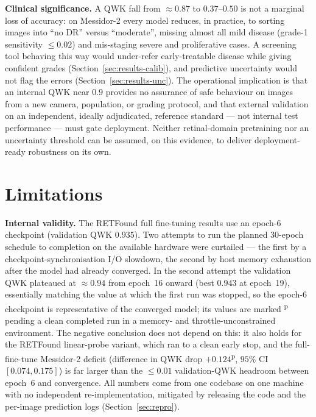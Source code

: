 \documentclass[journal]{IEEEtran}
\newcommand{\pv}[1]{#1\textsuperscript{p}}
\renewcommand{\_}{\origunderscore\allowbreak}
\begin{document}
\textbf{Clinical significance.} A QWK fall from $\approx 0.87$ to $0.37$--$0.50$
is not a marginal loss of accuracy: on Messidor-2 every model reduces, in
practice, to sorting images into ``no DR'' versus ``moderate'', missing almost
all mild disease (grade-1 sensitivity $\leq 0.02$) and mis-staging severe and
proliferative cases. A screening tool behaving this way would under-refer
early-treatable disease while giving confident grades
(Section~\ref{sec:results-calib}), and predictive uncertainty would not flag the
errors (Section~\ref{sec:results-unc}). The operational implication is that an
internal QWK near $0.9$ provides no assurance of safe behaviour on images from a
new camera, population, or grading protocol, and that external validation on an
independent, ideally adjudicated, reference standard --- not internal test
performance --- must gate deployment. Neither retinal-domain pretraining nor an
uncertainty threshold can be assumed, on this evidence, to deliver
deployment-ready robustness on its own.


\section{Limitations}
\label{sec:limitations}

\textbf{Internal validity.} The RETFound full fine-tuning results use an epoch-6
checkpoint (validation QWK $0.935$). Two attempts to run the planned $30$-epoch
schedule to completion on the available hardware were curtailed --- the first by a
checkpoint-synchronisation I/O slowdown, the second by host memory exhaustion
after the model had already converged. In the second attempt the validation QWK
plateaued at $\approx 0.94$ from epoch~16 onward (best $0.943$ at epoch~19),
essentially matching the value at which the first run was stopped, so the epoch-6
checkpoint is representative of the converged model; its values are marked
\textsuperscript{p} pending a clean completed run in a memory- and
throttle-unconstrained environment. The negative conclusion does not depend on
this: it also holds for the RETFound linear-probe variant, which ran to a clean
early stop, and the full-fine-tune Messidor-2 deficit (difference in QWK drop
\pv{$+0.124$}, $95\%$ CI $[0.074,0.175]$) is far larger than the $\leq 0.01$
validation-QWK headroom between epoch~6 and convergence. All numbers come from one
codebase on one machine with no independent re-implementation, mitigated by
releasing the code and the per-image prediction logs (Section~\ref{sec:repro}).
\end{document}
